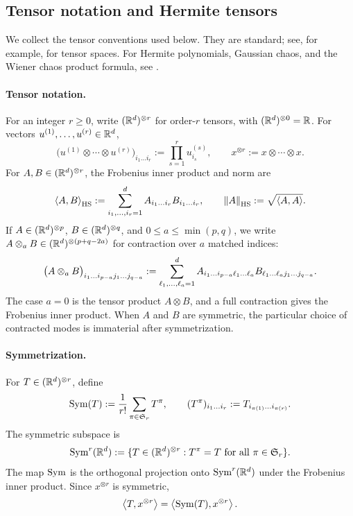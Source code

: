 

\subsection{Tensor notation and Hermite tensors}
\label{subsection:tensor-preliminaries}

We collect the tensor conventions used below.  They are standard; see, for example,
\citet{Hackbusch2012} for tensor spaces.
For Hermite polynomials, Gaussian chaos, and the Wiener chaos product formula, see \citet[Chapter~1-7]  {peccati2011wiener}.

\paragraph{Tensor notation.}
For an integer $r\ge0$, write $(\mathbb{R}^d)^{\otimes r}$ for order-$r$ tensors, with
$(\mathbb{R}^d)^{\otimes0}=\mathbb{R}$.  For vectors $u^{(1)},\dots,u^{(r)}\in\mathbb{R}^d$,
\[
\bigl(u^{(1)}\otimes\cdots\otimes u^{(r)}\bigr)_{i_1\dots i_r}
:=\prod_{s=1}^r u^{(s)}_{i_s},
\qquad
x^{\otimes r}:=x\otimes\cdots\otimes x.
\]
For $A,B\in(\mathbb{R}^d)^{\otimes r}$, the Frobenius inner product and norm are
\[
\left\langle A,B\right\rangle_{\mathrm{HS}}
:=\sum_{i_1,\dots,i_r=1}^d A_{i_1\dots i_r}B_{i_1\dots i_r},
\qquad
\norm{A}_{\mathrm{HS}}:=\sqrt{\left\langle A,A\right\rangle}.
\]
If $A\in(\mathbb{R}^d)^{\otimes p}$, $B\in(\mathbb{R}^d)^{\otimes q}$, and
$0\le a\le\min(p,q)$, we write $A\otimes_{a}B\in(\mathbb{R}^d)^{\otimes(p+q-2a)}$ for contraction over
$a$ matched indices:
\[
\bigl(A\otimes_{a}B\bigr)_{i_1\dots i_{p-a}j_1\dots j_{q-a}}
:=
\sum_{\ell_1,\dots,\ell_a=1}^d
A_{i_1\dots i_{p-a}\ell_1\dots\ell_a}
B_{\ell_1\dots\ell_a j_1\dots j_{q-a}} .
\]
The case $a=0$ is the tensor product $A\otimes B$, and a full contraction gives the Frobenius
inner product.  When $A$ and $B$ are symmetric, the particular choice of contracted modes is
immaterial after symmetrization.

\paragraph{Symmetrization.}
For $T\in(\mathbb{R}^d)^{\otimes r}$, define
\[
\mathrm{Sym}(T):=\frac1{r!}\sum_{\pi\in\mathfrak{S}_r}T^\pi,
\qquad
(T^\pi)_{i_1\dots i_r}:=T_{i_{\pi(1)}\dots i_{\pi(r)}}.
\]
The symmetric subspace is
\[
\mathrm{Sym}^r(\mathbb{R}^d):=
\{T\in(\mathbb{R}^d)^{\otimes r}:T^\pi=T\ \text{for all }\pi\in\mathfrak{S}_r\}.
\]
The map $\mathrm{Sym}$ is the orthogonal projection onto $\mathrm{Sym}^r(\mathbb{R}^d)$ under the Frobenius inner product.
Since $x^{\otimes r}$ is symmetric,
\[
\left\langle T,x^{\otimes r}\right\rangle=
\left\langle \mathrm{Sym}(T),x^{\otimes r}\right\rangle.
\]

